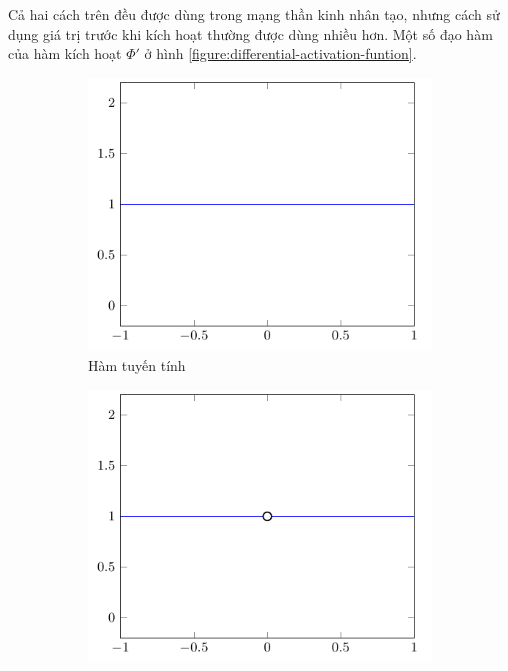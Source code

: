 Cả hai cách trên đều được dùng trong mạng thần kinh nhân tạo, nhưng cách sử dụng giá trị trước khi kích hoạt thường được dùng nhiều hơn. Một số đạo hàm của hàm kích hoạt $\Phi'$ ở hình \ref{figure:differential-activation-funtion}.
\begin{figure}[htbp]
    \centering
    \begin{subfigure}[b]{0.33\textwidth}
        \centering
        \includegraphics[width=\textwidth]{tikz_image/diff_identity.pdf}
        \caption{Hàm tuyến tính}
    \end{subfigure}%
    \begin{subfigure}[b]{0.33\textwidth}
        \centering
        \includegraphics[width=\textwidth]{tikz_image/diff_sign.pdf}

\end{subfigure}
\end{figure}
